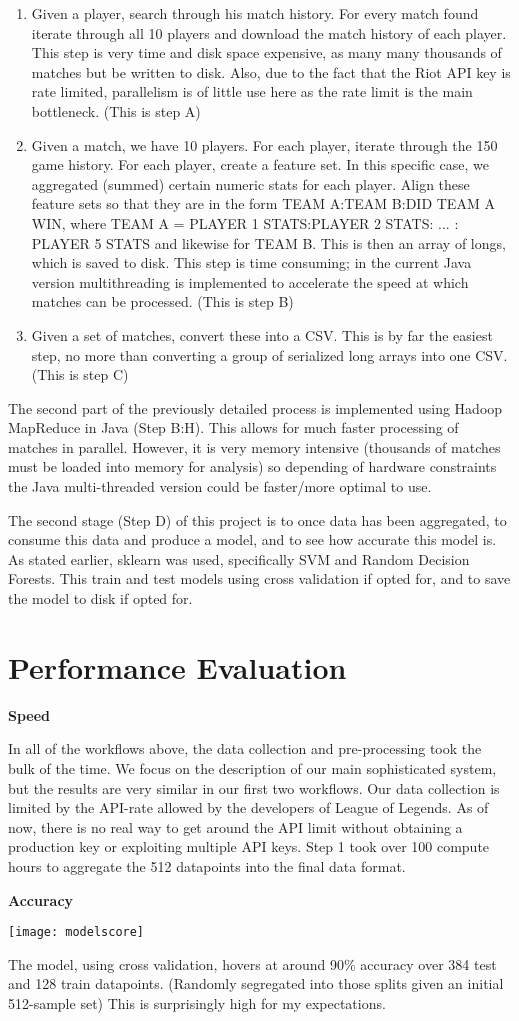 \begin{enumerate}
\item Given a player, search through his match history. For every match found iterate through all 10 players and download the match history of each player. This step is very time and disk space expensive, as many many thousands of matches but be written to disk. Also, due to the fact that the Riot API key is rate limited, parallelism is of little use here as the rate limit is the main bottleneck. (This is step A)
\item Given a match, we have 10 players. For each player, iterate through the 150 game history. For each player, create a feature set. In this specific case, we aggregated (summed) certain numeric stats for each player. Align these feature sets so that they are in the form TEAM A:TEAM B:DID TEAM A WIN, where TEAM A = PLAYER 1 STATS:PLAYER 2 STATS: ... : PLAYER 5 STATS and likewise for TEAM B. This is then an array of longs, which is saved to disk. This step is time consuming; in the current Java version multithreading is implemented to accelerate the speed at which matches can be processed. (This is step B)
\item Given a set of matches, convert these into a CSV. This is by far the easiest step, no more than converting a group of serialized long arrays into one CSV. (This is step C)

\end{enumerate}

The second part of the previously detailed process is implemented using Hadoop MapReduce in Java (Step B:H). This allows for much faster processing of matches in parallel. However, it is very memory intensive (thousands of matches must be loaded into memory for analysis) so depending of hardware constraints 
the Java multi-threaded version could be faster/more optimal to use. 

The second stage (Step D) of this project is to once data has been aggregated, to consume this data and produce a model, and to see how accurate this model is. As stated earlier, sklearn was used, specifically SVM and Random Decision Forests. This train and test models using cross validation if opted for, and to save the model to disk if opted for. 


\section{Performance Evaluation}
\textbf{Speed}

In all of the workflows above, the data collection and pre-processing took the bulk of the time.  We focus on the description of our main sophisticated system, but the results are very similar in our first two workflows.  Our data collection is limited by the API-rate allowed by the developers of League of Legends.  As of now, there is no real way to get around the API limit without obtaining a 
production key or exploiting multiple API keys. Step 1 took over 100 compute hours to aggregate the 512 datapoints into the final data format.

\textbf{Accuracy}

\texttt{[image: modelscore]}

The model, using cross validation, hovers at around 90\% accuracy over 384 test and 128 train datapoints. (Randomly segregated into those splits given an initial 512-sample set) This is surprisingly high for my expectations.